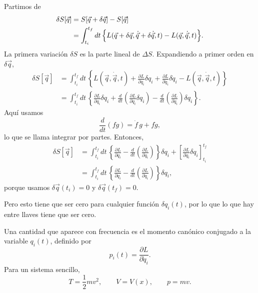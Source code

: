\documentclass[11pt,a4paper]{article}
\newcommand{\concept}[1]{\textcolor{concept-green}{#1}}
\begin{document}
Partimos de
\begin{align*}
  \delta S[\vec q]
  &=S[\vec q+\delta\vec q]-S[\vec q]\\
  &=\int_{t_i}^{t_f}dt\,
  \Bigl\{
    L(\vec q+\delta\vec q,
      \dot{\vec q}+\delta\dot{\vec q},t)
    -L(\vec q,\dot{\vec q},t)
  \Bigr\}.
\end{align*}
La primera variación $\delta S$ es la parte lineal de $\Delta S$.
Expandiendo a primer orden en $\delta\vec q$,
\begin{align*}
  \delta S[\vec q]
  &=\int_{t_i}^{t_f}dt\,
  \left\{
    L(\vec q,\dot{\vec q},t)
    +\frac{\partial L}{\partial q_i}\delta q_i
    +\frac{\partial L}{\partial\dot q_i}\delta\dot q_i
    -L(\vec q,\dot{\vec q},t)
  \right\}\\
  &=\int_{t_i}^{t_f}dt\,
  \left\{
    \frac{\partial L}{\partial q_i}\delta q_i
    +\frac{d}{dt}\left(
      \frac{\partial L}{\partial\dot q_i}\delta q_i
    \right)
    -\frac{d}{dt}\left(
      \frac{\partial L}{\partial\dot q_i}
    \right)\delta q_i
  \right\}.
\end{align*}
Aquí usamos
\[
  \frac{d}{dt}(fg)=\dot f\,g+f\dot g,
\]
lo que se llama integrar por partes. Entonces,
\begin{align*}
  \delta S[\vec q]
  &=\int_{t_i}^{t_f}dt\,
  \left\{
    \frac{\partial L}{\partial q_i}
    -\frac{d}{dt}\left(
      \frac{\partial L}{\partial\dot q_i}
    \right)
  \right\}\delta q_i
  +\left[
    \frac{\partial L}{\partial\dot q_i}\delta q_i
  \right]_{t_i}^{t_f}\\
  &=\int_{t_i}^{t_f}dt\,
  \left\{
    \frac{\partial L}{\partial q_i}
    -\frac{d}{dt}\left(
      \frac{\partial L}{\partial\dot q_i}
    \right)
  \right\}\delta q_i,
\end{align*}
porque usamos $\delta\vec q(t_i)=0$ y $\delta\vec q(t_f)=0$.

Pero esto tiene que ser cero para cualquier función $\delta q_i(t)$, por lo que lo que hay entre llaves tiene que ser cero.

Una cantidad que aparece con frecuencia es el \concept{momento canónico conjugado} a la variable $q_i(t)$, definido por
\[
  p_i(t)=\frac{\partial L}{\partial\dot q_i}.
\]
Para un sistema sencillo,
\[
  T=\frac12 mv^2,
  \qquad
  V=V(x),
  \qquad
  p=mv.
\]
\end{document}
